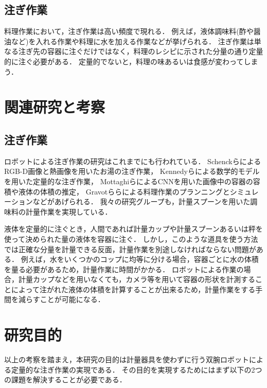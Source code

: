 	\subsection{注ぎ作業}
	料理作業において，注ぎ作業は高い頻度で現れる．
	例えば，液体調味料(酢や醤油など)を入れる作業や料理に水を加える作業などが挙げられる．
	注ぎ作業は単なる注ぎ先の容器に注ぐだけではなく，料理のレシピに示された分量の通り定量的に注ぐ必要がある．
	定量的でないと，料理の味あるいは食感が変わってしまう．

\section{関連研究と考察}\label{sec:Intro}
	\subsection{注ぎ作業}
	ロボットによる注ぎ作業の研究はこれまでにも行われている．
	Schenckら\cite{Related1}によるRGB-D画像と熱画像を用いたお湯の注ぎ作業，
	Kennedyら\cite{Related2}による数学的モデルを用いた定量的な注ぎ作業，
	Mottaghiら\cite{Related4}によるCNNを用いた画像中の容器の容積や液体の体積の推定，
	Gravotら\cite{Related3}らによる料理作業のプランニングとシミュレーションなどがあげられる．
	我々の研究グループも，計量スプーンを用いた調味料の計量作業\cite{福島さんの修論}を実現している．
	
	液体を定量的に注ぐとき，人間であれば計量カップや計量スプーンあるいは秤を使って決められた量の液体を容器に注ぐ．
	しかし，このような道具を使う方法では正確な分量を計量できる反面，計量作業を別途しなければならない問題がある．
	例えば，水をいくつかのコップに均等に分ける場合，容器ごとに水の体積を量る必要があるため，計量作業に時間がかかる．
	ロボットによる作業の場合，計量カップなどを用いなくても，カメラ等を用いて容器の形状を計測することによって注がれた液体の体積を計算することが出来るため，計量作業をする手間を減らすことが可能になる．
	
\section{研究目的}\label{sec:purpose}
以上の考察を踏まえ，本研究の目的は計量器具を使わずに行う双腕ロボットによる定量的な注ぎ作業の実現である．
その目的を実現するためにはまず以下の2つの課題を解決することが必要である．


